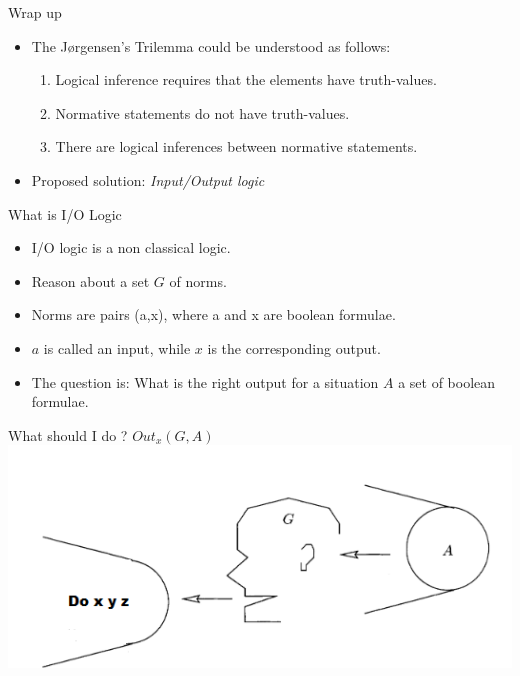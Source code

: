 \documentclass[9pt]{beamer}
\begin{document}
\begin{frame}{Wrap up}
\begin{itemize}
\item The J\o{}rgensen's Trilemma could be understood as follows:
\begin{enumerate}
	\item Logical inference requires that the elements have truth-values.
	\item Normative statements do not have truth-values.
	\item There are logical inferences between normative statements.
\end{enumerate}
\item Proposed solution: \textit{Input/Output logic}
\end{itemize}
\end{frame}

\begin{frame}{What is I/O Logic}
	\begin{itemize}
	\item I/O logic is a non classical logic.
	\item Reason about a set $G$ of norms.
	\item Norms are pairs (a,x), where a and x are boolean formulae.
	\item $a$ is called an input, while $x$ is the corresponding output.
	\item The question is: What is the right output for a situation  $A$ a set of boolean formulae.
	\end{itemize}
    \end{frame}

\begin{frame}{What should I do ? $Out_x(G,A)$}
\centering
\includegraphics[scale=0.60]{react.png}
\end{frame}
\end{document}
